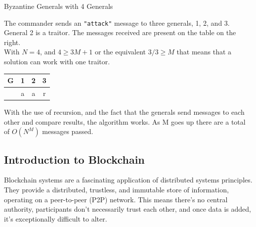 \begin{example}{Byzantine Generals with 4 Generals}
\begin{minipage}{0.75\textwidth} %
The commander sends an \texttt{"attack"} message to three generals, 1, 2, and 3. General 2 is a traitor. The messages received are present on the table on the right. \\

With $N=4$, and $4 \geq 3M+1$ or the equivalent $3/3 \geq M$ that means that a solution can work with one traitor.
\end{minipage}
\hfill
\begin{minipage}{0.2\textwidth} %
\begin{center}
\begin{tabular}{|c|c|c|c|}
    \hline
    G & 1 & 2 & 3 \\ \hline
    ~ & a & a & r \\ \hline
\end{tabular}
\end{center}
\end{minipage}
\end{example}

With the use of recursion, and the fact that the generals send messages to each other and compare results, the algorithm works. As M goes up there are a total of $O(N^{M})$ messages passed.

\subsection{Introduction to Blockchain}
Blockchain systems are a fascinating application of distributed systems principles. They provide a distributed, trustless, and immutable store of information, operating on a peer-to-peer (P2P) network.  This means there's no central authority, participants don't necessarily trust each other, and once data is added, it's exceptionally difficult to alter.

